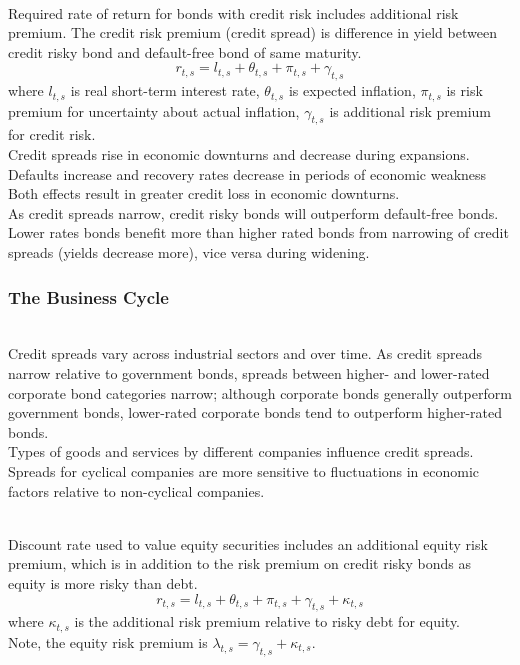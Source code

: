 \begin{remark} \\
Required rate of return for bonds with credit risk includes additional risk premium. The credit risk premium (credit spread) is difference in yield between credit risky bond and default-free bond of same maturity.
\begin{equation}
r_{t,s} = l_{t,s} + \theta_{t,s} + \pi_{t,s} + \gamma_{t,s} \nonumber 
\end{equation}
where $l_{t,s}$ is real short-term interest rate, $\theta_{t,s}$ is expected inflation, $\pi_{t,s}$ is risk premium for uncertainty about actual inflation, $\gamma_{t,s}$ is additional risk premium for credit risk.\\
Credit spreads rise in economic downturns and decrease during expansions. Defaults increase and recovery rates decrease in periods of economic weakness Both effects result in greater credit loss in economic downturns.\\
As credit spreads narrow, credit risky bonds will outperform default-free bonds. Lower rates bonds benefit more than higher rated bonds from narrowing of credit spreads (yields decrease more), vice versa during widening.
\end{remark}

\subsubsection{The Business Cycle}

\begin{remark} \\
Credit spreads vary across industrial sectors and over time. As credit spreads narrow relative to government bonds, spreads between higher- and lower-rated corporate bond categories narrow; although corporate bonds generally outperform government bonds, lower-rated corporate bonds tend to outperform higher-rated bonds.\\
Types of goods and services by different companies influence credit spreads. Spreads for cyclical companies are more sensitive to fluctuations in economic factors relative to non-cyclical companies.
\end{remark}

\begin{remark} \\
Discount rate used to value equity securities includes an additional equity risk premium, which is in addition to the risk premium on credit risky bonds as equity is more risky than debt.
\begin{equation}
r_{t,s} = l_{t,s} + \theta_{t,s} + \pi_{t,s} + \gamma_{t,s} + \kappa_{t,s} \nonumber 
\end{equation}
where $\kappa_{t,s}$ is the additional risk premium relative to risky debt for equity.\\
Note, the equity risk premium is $\lambda_{t,s} = \gamma_{t,s} + \kappa_{t,s}$.
\end{remark}

